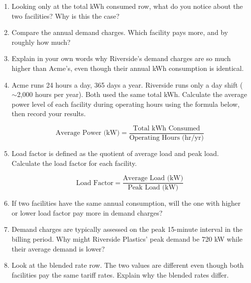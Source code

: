 \documentclass[./main.tex]{subfiles}
\begin{document}
\begin{enumerate}
  \item Looking only at the total kWh consumed row, what do you notice about
        the two facilities? Why is this the case?
        \vspace{1.25in}

  \item Compare the annual demand charges. Which facility pays more, and by
        roughly how much?
        \vspace{1.25in}

  \item Explain in your own words why Riverside's demand charges are so much
        higher than Acme's, even though their annual kWh consumption is
        identical.
        \vspace{1.25in}

  \item Acme runs 24 hours a day, 365 days a year. Riverside runs only a day
        shift ($\sim$2,000 hours per year). Both used the same total kWh.
        Calculate the average power level of each facility during operating
        hours using the formula below, then record your results.

        \[
          \text{Average Power (kW)} = \frac{\text{Total kWh Consumed}}{\text{Operating Hours (hr/yr)}}
        \]
        \vspace{1.25in}

  \item Load factor is defined as the quotient of average load and peak load.
        Calculate the load factor for each facility.

        \[
          \text{Load Factor} = \frac{\text{Average Load (kW)}}{\text{Peak Load (kW)}}
        \]
        \vspace{1.25in}

  \item If two facilities have the same annual consumption, will the one with
        higher or lower load factor pay more in demand charges?
        \vspace{1.25in}

  \item Demand charges are typically assessed on the peak 15-minute interval
        in the billing period. Why might Riverside Plastics' peak demand be
        720 kW while their average demand is lower?
        \vspace{1.25in}

  \item Look at the blended rate row. The two values are different even though
        both facilities pay the same tariff rates. Explain why the blended
        rates differ.
        \vspace{1.25in}
\end{enumerate}
\end{document}

